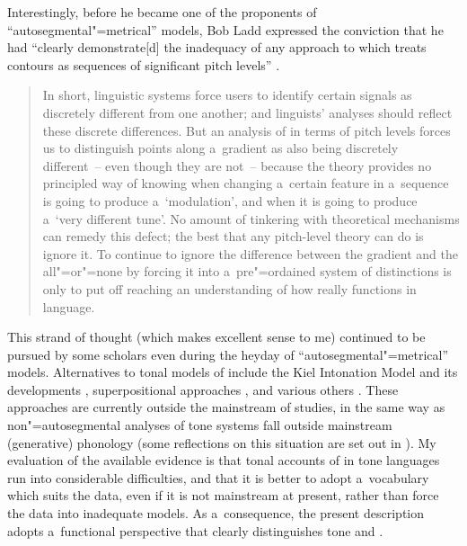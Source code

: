 Interestingly, before he became one of the proponents of “autosegmental"=metrical” models, Bob Ladd expressed the conviction that he had “clearly demonstrate[d] the inadequacy of any approach to   which treats contours as sequences of significant pitch levels” \citep[517]{ladd1978}.

\begin{quotation}
	In short, linguistic systems force users to identify certain signals as discretely different from one another; and linguists' analyses should reflect these discrete differences. But an analysis of  in terms of pitch levels forces us to distinguish points along a~gradient as also being discretely different~-- even though they are not~-- because the theory provides no principled way of knowing when changing a~certain feature in a~sequence is going to produce a~‘modulation’, and when it is going to produce a~‘very different tune’. No amount of tinkering with theoretical mechanisms can remedy this defect; the best that any pitch-level theory can do is ignore it. To continue to ignore the difference between the gradient and the all"=or"=none by forcing it into a~pre"=ordained system of distinctions is only to put off reaching an understanding of how  really functions in language. \citep[539]{ladd1978}
\end{quotation}

{\noindent}This strand of thought (which makes excellent sense to me) continued to be pursued by some scholars even during the heyday of “autosegmental"=metrical” models. Alternatives to tonal models of  include the Kiel Intonation Model and its developments
\citep{niebuhretal2004,kohler2005,niebuhr2007,Niebuhr2010}, superpositional approaches
\citep{vaissiere2002,vaissiere2004,gronnum1991,gronnum1998a,gronnum1998b,lindau1986}, and various others \citep{delattre1966a,fonagy1989,rossi1999,martin1977b,martin2015,hirstetal1998b}. These approaches are currently
outside the mainstream of  studies, in the same way as non"=autosegmental analyses of tone
systems fall outside mainstream (generative) phonology (some reflections on this situation are set
out in \citealt{zerbian2010,michaudetal2015f}). My evaluation of the available evidence is
that tonal accounts of  in tone languages run into considerable difficulties, and that it
is better to adopt a~vocabulary which suits the data, even if it is not mainstream at present,
rather than force the data into inadequate models. As a~consequence, the
present description adopts a~functional
perspective that clearly distinguishes tone and .

